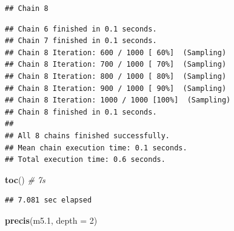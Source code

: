 \documentclass[
]{book}
\newenvironment{Shaded}{\begin{snugshade}}{\end{snugshade}}
\newcommand{\AttributeTok}[1]{\textcolor[rgb]{0.13,0.29,0.53}{#1}}
\newcommand{\CommentTok}[1]{\textcolor[rgb]{0.56,0.35,0.01}{\textit{#1}}}
\newcommand{\DecValTok}[1]{\textcolor[rgb]{0.00,0.00,0.81}{#1}}
\newcommand{\FloatTok}[1]{\textcolor[rgb]{0.00,0.00,0.81}{#1}}
\newcommand{\FunctionTok}[1]{\textcolor[rgb]{0.13,0.29,0.53}{\textbf{#1}}}
\newcommand{\NormalTok}[1]{#1}
\begin{document}
\begin{verbatim}
## Chain 8
\end{verbatim}

\begin{verbatim}
## Chain 6 finished in 0.1 seconds.
## Chain 7 finished in 0.1 seconds.
## Chain 8 Iteration: 600 / 1000 [ 60%]  (Sampling) 
## Chain 8 Iteration: 700 / 1000 [ 70%]  (Sampling) 
## Chain 8 Iteration: 800 / 1000 [ 80%]  (Sampling) 
## Chain 8 Iteration: 900 / 1000 [ 90%]  (Sampling) 
## Chain 8 Iteration: 1000 / 1000 [100%]  (Sampling) 
## Chain 8 finished in 0.1 seconds.
## 
## All 8 chains finished successfully.
## Mean chain execution time: 0.1 seconds.
## Total execution time: 0.6 seconds.
\end{verbatim}

\begin{Shaded}
\begin{Highlighting}[]
\FunctionTok{toc}\NormalTok{() }\CommentTok{\# 7s}
\end{Highlighting}
\end{Shaded}

\begin{verbatim}
## 7.081 sec elapsed
\end{verbatim}

\begin{Shaded}
\begin{Highlighting}[]
\FunctionTok{precis}\NormalTok{(m5}\FloatTok{.1}\NormalTok{, }\AttributeTok{depth =} \DecValTok{2}\NormalTok{)}
\end{Highlighting}
\end{Shaded}
\end{document}
